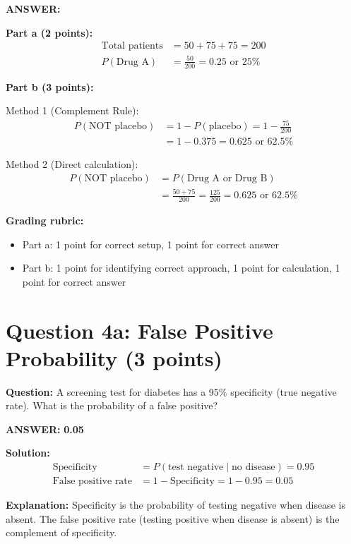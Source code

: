 \documentclass[11pt]{article}
\begin{document}
\textbf{ANSWER:}

\textbf{Part a (2 points):}
\begin{align*}
\text{Total patients} &= 50 + 75 + 75 = 200\\
P(\text{Drug A}) &= \frac{50}{200} = 0.25 \text{ or } 25\%
\end{align*}

\textbf{Part b (3 points):}

Method 1 (Complement Rule):
\begin{align*}
P(\text{NOT placebo}) &= 1 - P(\text{placebo}) = 1 - \frac{75}{200}\\
&= 1 - 0.375 = 0.625 \text{ or } 62.5\%
\end{align*}

Method 2 (Direct calculation):
\begin{align*}
P(\text{NOT placebo}) &= P(\text{Drug A or Drug B})\\
&= \frac{50 + 75}{200} = \frac{125}{200} = 0.625 \text{ or } 62.5\%
\end{align*}

\textbf{Grading rubric:}
\begin{itemize}
    \item Part a: 1 point for correct setup, 1 point for correct answer
    \item Part b: 1 point for identifying correct approach, 1 point for calculation, 1 point for correct answer
\end{itemize}

\vspace{0.3cm}
\noindent\hrulefill

\section*{Question 4a: False Positive Probability (3 points)}

\textbf{Question:} A screening test for diabetes has a 95\% specificity (true negative rate). What is the probability of a false positive?

\textbf{ANSWER:} \textbf{0.05}

\textbf{Solution:}
\begin{align*}
\text{Specificity} &= P(\text{test negative} \mid \text{no disease}) = 0.95\\
\text{False positive rate} &= 1 - \text{Specificity} = 1 - 0.95 = 0.05
\end{align*}

\textbf{Explanation:} Specificity is the probability of testing negative when disease is absent. The false positive rate (testing positive when disease is absent) is the complement of specificity.
\end{document}
